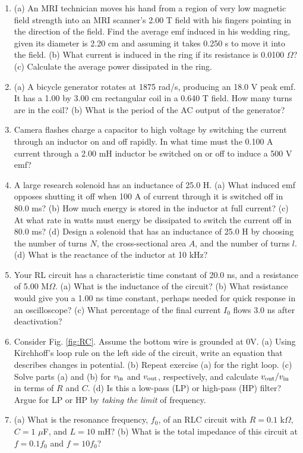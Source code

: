 \documentclass[12pt,twocolumn]{article}
\begin{document}
\begin{enumerate}
\item (a) An MRI technician moves his hand from a region of very low magnetic field strength into an MRI scanner's 2.00 T field with his fingers pointing in the direction of the field. Find the average emf induced in his wedding ring, given its diameter is 2.20 cm and assuming it takes 0.250 s to move it into the field. (b) What current is induced in the ring if its resistance is 0.0100 $\Omega$?  (c) Calculate the average power dissipated in the ring.
\item (a) A bicycle generator rotates at 1875 rad/s, producing an 18.0 V peak emf. It has a 1.00 by 3.00 cm rectangular coil in a 0.640 T field. How many turns are in the coil? (b) What is the period of the AC output of the generator?
\item Camera flashes charge a capacitor to high voltage by switching the current through an inductor on and off rapidly. In what time must the 0.100 A current through a 2.00 mH inductor be switched on or off to induce a 500 V emf?
\item A large research solenoid has an inductance of 25.0 H. (a) What induced emf opposes shutting it off when 100 A of current through it is switched off in 80.0 ms? (b) How much energy is stored in the inductor at full current? (c) At what rate in watts must energy be dissipated to switch the current off in 80.0 ms? (d) Design a solenoid that has an inductance of 25.0 H by choosing the number of turns $N$, the cross-sectional area $A$, and the number of turns $l$. (d) What is the reactance of the inductor at 10 kHz?
\item Your RL circuit has a characteristic time constant of 20.0 ns, and a resistance of 5.00 M$\Omega$. (a) What is the inductance of the circuit? (b) What resistance would give you a 1.00 ns time constant, perhaps needed for quick response in an oscilloscope? (c) What percentage of the final current $I_0$ flows 3.0 ns after deactivation?
\item Consider Fig. \ref{fig:RC}.  Assume the bottom wire is grounded at 0V.  (a) Using Kirchhoff's loop rule on the left side of the circuit, write an equation that describes changes in potential.  (b) Repeat exercise (a) for the right loop.  (c) Solve parts (a) and (b) for $v_{\rm in}$ and $v_{\rm out}$, respectively, and calculate $v_{\rm out}/v_{\rm in}$ in terms of $R$ and $C$. (d) Is this a low-pass (LP) or high-pass (HP) filter?  Argue for LP or HP by \textit{taking the limit} of frequency.
\item (a) What is the resonance frequency, $f_0$, of an RLC circuit with $R = 0.1$ k$\Omega$, $C = 1$ $\mu$F, and $L = 10$ mH? (b) What is the total impedance of this circuit at $f = 0.1f_0$ and $f = 10f_0$?

\end{enumerate}
\end{document}
